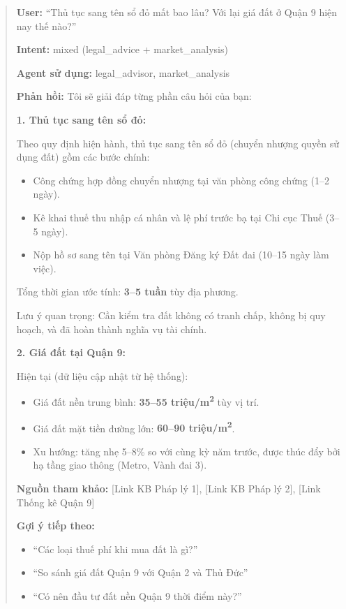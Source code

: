 \begin{quote}
\textbf{User:} ``Thủ tục sang tên sổ đỏ mất bao lâu? Với lại giá đất ở Quận 9 hiện nay thế nào?''

\textbf{Intent:} mixed (legal\_advice + market\_analysis)

\textbf{Agent sử dụng:} legal\_advisor, market\_analysis

\textbf{Phản hồi:}
Tôi sẽ giải đáp từng phần câu hỏi của bạn:

\textbf{1. Thủ tục sang tên sổ đỏ:}

Theo quy định hiện hành, thủ tục sang tên sổ đỏ (chuyển nhượng quyền sử dụng đất) gồm các bước chính:
\begin{itemize}
    \item Công chứng hợp đồng chuyển nhượng tại văn phòng công chứng (1--2 ngày).
    \item Kê khai thuế thu nhập cá nhân và lệ phí trước bạ tại Chi cục Thuế (3--5 ngày).
    \item Nộp hồ sơ sang tên tại Văn phòng Đăng ký Đất đai (10--15 ngày làm việc).
\end{itemize}
Tổng thời gian ước tính: \textbf{3--5 tuần} tùy địa phương.

Lưu ý quan trọng: Cần kiểm tra đất không có tranh chấp, không bị quy hoạch, và đã hoàn thành nghĩa vụ tài chính.

\textbf{2. Giá đất tại Quận 9:}

Hiện tại (dữ liệu cập nhật từ hệ thống):
\begin{itemize}
    \item Giá đất nền trung bình: \textbf{35--55 triệu/m\textsuperscript{2}} tùy vị trí.
    \item Giá đất mặt tiền đường lớn: \textbf{60--90 triệu/m\textsuperscript{2}}.
    \item Xu hướng: tăng nhẹ 5--8\% so với cùng kỳ năm trước, được thúc đẩy bởi hạ tầng giao thông (Metro, Vành đai 3).
\end{itemize}

\textbf{Nguồn tham khảo:} [Link KB Pháp lý 1], [Link KB Pháp lý 2], [Link Thống kê Quận 9]

\textbf{Gợi ý tiếp theo:}
\begin{itemize}
    \item ``Các loại thuế phí khi mua đất là gì?''
    \item ``So sánh giá đất Quận 9 với Quận 2 và Thủ Đức''
    \item ``Có nên đầu tư đất nền Quận 9 thời điểm này?''
\end{itemize}
\end{quote}

\newpage
